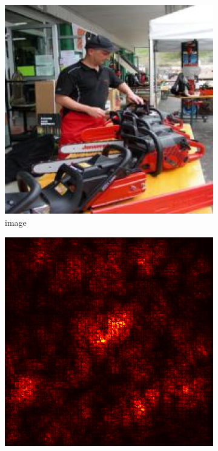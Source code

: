 \documentclass[preprint,12pt]{elsarticle}
\begin{document}
\begin{figure}
    \centering
    \begin{subfigure}{0.14\linewidth}
        \centering
        \includegraphics[width=\linewidth]{../visualizations/examples/imagenette/cnn/images/0.png}
        \caption{image}
    \end{subfigure}
    \hfill
    \begin{subfigure}{0.14\linewidth}
        \centering
        \includegraphics[width=\linewidth]{../visualizations/examples/imagenette/cnn/saliency_map/0.png}

\end{subfigure}
\end{figure}
\end{document}
